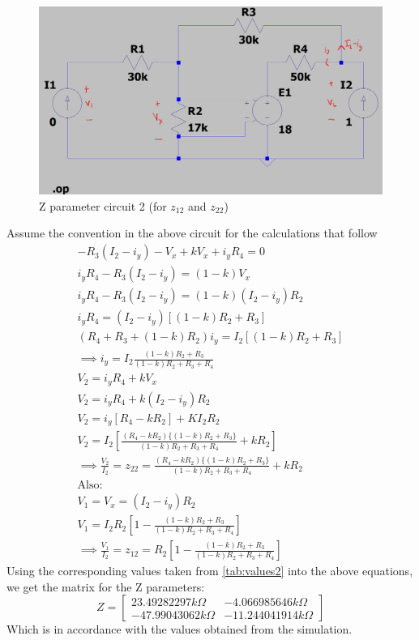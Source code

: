 \documentclass{article}[12pt]
\begin{document}
\begin{figure}[ht]
    \centering
    \includegraphics[scale=0.25]{resources/zparams2.png}
    \caption{Z parameter circuit 2 (for $z_{12}$ and $z_{22}$)}
\end{figure}
Assume the convention in the above circuit for the calculations that follow
\begin{gather*}
    -R_3(I_2-i_y)-V_x+kV_x+i_yR_4=0\\
    i_yR_4-R_3(I_2-i_y)=(1-k)V_x\\
    i_yR_4-R_3(I_2-i_y)=(1-k)(I_2-i_y)R_2\\
    i_yR_4=(I_2-i_y)[(1-k)R_2+R_3]\\
    (R_4+R_3+(1-k)R_2)i_y=I_2[(1-k)R_2+R_3]\\
    \implies i_y=I_2\frac{(1-k)R_2+R_3}{(1-k)R_2+R_3+R_4}\\
    V_2=i_yR_4+kV_x\\
    V_2=i_yR_4+k(I_2-i_y)R_2\\
    V_2=i_y[R_4-kR_2]+KI_2R_2\\
    V_2=I_2\left[\frac{(R_4-kR_2)\{(1-k)R_2+R_3\}}{(1-k)R_2+R_3+R_4}+kR_2\right]\\
    \implies \frac{V_2}{I_2} = \boxed{z_{22} = \frac{(R_4-kR_2)\{(1-k)R_2+R_3\}}{(1-k)R_2+R_3+R_4}+kR_2}\\
    \mathrm{Also:} \\
    V_1=V_x=(I_2-i_y)R_2\\
    V_1=I_2R_2\left[1-\frac{(1-k)R_2+R_3}{(1-k)R_2+R_3+R_4}\right]\\
    \implies \frac{V_1}{I_2} = \boxed{z_{12} = R_2\left[1-\frac{(1-k)R_2+R_3}{(1-k)R_2+R_3+R_4}\right]}
\end{gather*}
\newpage
Using the corresponding values taken from \hyperref[tab:values2]{\ref{tab:values2}} into the above equations, we get the matrix for the Z parameters:
$$ Z = \begin{bmatrix}
        23.49282297k\Omega  & -4.066985646k\Omega  \\
        -47.99043062k\Omega & -11.244041914k\Omega
    \end{bmatrix}
$$
Which is in accordance with the values obtained from the simulation.
\end{document}
